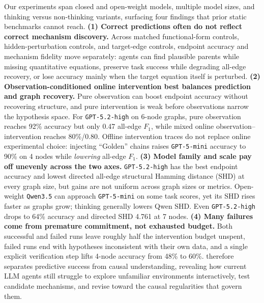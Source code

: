 Our experiments span closed and open-weight models, multiple model sizes, and thinking versus non-thinking variants, surfacing four findings that prior static benchmarks cannot reach. \textbf{(1) Correct predictions often do not reflect correct mechanism discovery.} Across matched functional-form controls, hidden-perturbation controls, and target-edge controls, endpoint accuracy and mechanism fidelity move separately: agents can find plausible parents while missing quantitative equations, preserve task success while degrading all-edge recovery, or lose accuracy mainly when the target equation itself is perturbed. \textbf{(2) Observation-conditioned online intervention best balances prediction and graph recovery.} Pure observation can boost endpoint accuracy without recovering structure, and pure intervention is weak before observations narrow the hypothesis space. For \texttt{GPT-5.2-high} on 6-node graphs, pure observation reaches 92\% accuracy but only 0.47 all-edge $F_1$, while mixed online observation--intervention reaches 80\%/0.80. Offline intervention traces do not replace online experimental choice: injecting ``Golden'' chains raises \texttt{GPT-5-mini} accuracy to 90\% on 4 nodes while \emph{lowering} all-edge $F_1$. \textbf{(3) Model family and scale pay off unevenly across the two axes.} \texttt{GPT-5.2-high} has the best endpoint accuracy and lowest directed all-edge structural Hamming distance (SHD) at every graph size, but gains are not uniform across graph sizes or metrics. Open-weight \texttt{Qwen3.5} can approach \texttt{GPT-5-mini} on some task scores, yet its SHD rises faster as graphs grow; thinking generally lowers Qwen SHD. Even \texttt{GPT-5.2-high} drops to 64\% accuracy and directed SHD 4.761 at 7 nodes. \textbf{(4) Many failures come from premature commitment, not exhausted budget.} Both successful and failed runs leave roughly half the intervention budget unspent, failed runs end with hypotheses inconsistent with their own data, and a single explicit verification step lifts 4-node accuracy from 48\% to 60\%. \projectname{} therefore separates predictive success from causal understanding, revealing how current LLM agents still struggle to explore unfamiliar environments interactively, test candidate mechanisms, and revise toward the causal regularities that govern them.

